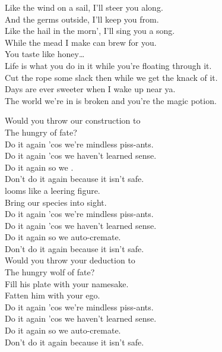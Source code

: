 Like the wind on a sail, I'll steer you along. \\
And the germs outside, I'll keep you from. \\
Like the hail in the morn', I'll sing you a song. \\
While the mead I make can brew for you. \\

You taste like honey… \\

Life is what you do in it while you're floating through it. \\
Cut the rope some slack then while we get the knack of it. \\
Days are ever sweeter when I wake up near ya. \\
The world we're in is broken and you're the magic potion. \\





Would you throw our construction to \\
The hungry  of fate? \\

Do it again 'cos we're mindless piss-ants. \\
Do it again 'cos we haven't learned sense. \\
Do it again so we . \\
Don't do it again because it isn't safe. \\

 looms like a leering figure. \\
Bring our species into sight. \\

Do it again 'cos we're mindless piss-ants. \\
Do it again 'cos we haven't learned sense. \\
Do it again so we auto-cremate. \\
Don't do it again because it isn't safe. \\

Would you throw your deduction to \\
The hungry wolf of fate? \\
Fill his plate with your namesake. \\
Fatten him with your ego. \\

Do it again 'cos we're mindless piss-ants. \\
Do it again 'cos we haven't learned sense. \\
Do it again so we auto-cremate. \\
Don't do it again because it isn't safe. \\
